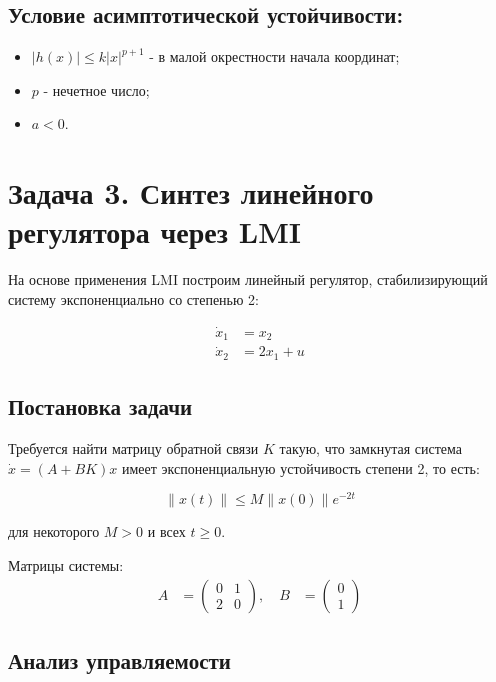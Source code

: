 \subsection{Условие асимптотической устойчивости:}
\begin{itemize}
\item $|h(x)| \leq k|x|^{p+1}$ - в малой окрестности начала координат;
\item $p$ - нечетное число;
\item $a < 0$.
\end{itemize}

\section*{Задача 3. Синтез линейного регулятора через LMI}

На основе применения LMI построим линейный регулятор, стабилизирующий систему экспоненциально со степенью 2:

\begin{align}
\dot{x}_1 &= x_2 \\
\dot{x}_2 &= 2x_1 + u
\end{align}

\subsection*{Постановка задачи}

Требуется найти матрицу обратной связи $K$ такую, что замкнутая система $\dot{x} = (A + BK)x$ имеет экспоненциальную устойчивость степени 2, то есть:

\begin{equation}
\|x(t)\| \leq M\|x(0)\|e^{-2t}
\end{equation}

для некоторого $M > 0$ и всех $t \geq 0$.

Матрицы системы:
\begin{align}
A &= \begin{pmatrix} 0 & 1 \\ 2 & 0 \end{pmatrix}, \quad
B &= \begin{pmatrix} 0 \\ 1 \end{pmatrix}
\end{align}

\subsection*{Анализ управляемости}

